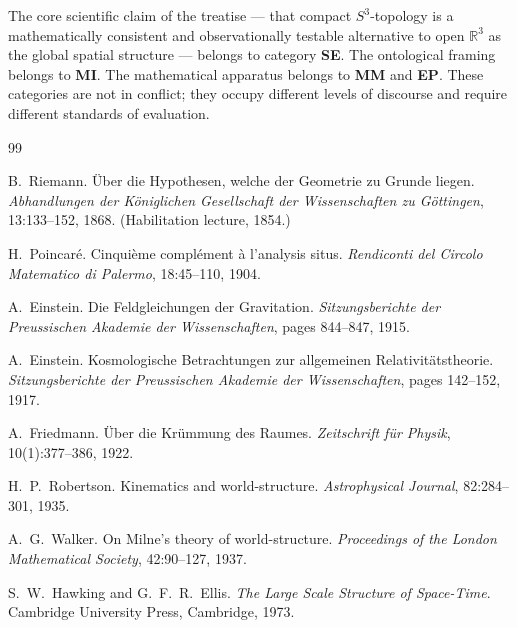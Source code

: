 \documentclass[12pt,a4paper]{article}
\theoremstyle{definition}
\begin{document}
\bigskip
The core scientific claim of the treatise — that compact $S^3$-topology is a mathematically consistent and observationally testable alternative to open $\mathbb{R}^3$ as the global spatial structure — belongs to category \colorbox{clSpec}{\textbf{SE}}.
The ontological framing belongs to \colorbox{clMeta}{\textbf{MI}}.
The mathematical apparatus belongs to \colorbox{clModel}{\textbf{MM}} and \colorbox{clEstab}{\textbf{EP}}.
These categories are not in conflict; they occupy different levels of discourse and require different standards of evaluation.

\clearpage
\begin{thebibliography}{99}

B.~Riemann.
\newblock \"{U}ber die Hypothesen, welche der Geometrie zu Grunde liegen.
\newblock \emph{Abhandlungen der K\"{o}niglichen Gesellschaft der Wissenschaften zu G\"{o}ttingen}, 13:133--152, 1868.
\newblock (Habilitation lecture, 1854.)

H.~Poincar\'{e}.
\newblock Cinqui\`{e}me compl\'{e}ment \`{a} l'analysis situs.
\newblock \emph{Rendiconti del Circolo Matematico di Palermo}, 18:45--110, 1904.

A.~Einstein.
\newblock Die Feldgleichungen der Gravitation.
\newblock \emph{Sitzungsberichte der Preussischen Akademie der Wissenschaften}, pages 844--847, 1915.

A.~Einstein.
\newblock Kosmologische Betrachtungen zur allgemeinen Relativit\"{a}tstheorie.
\newblock \emph{Sitzungsberichte der Preussischen Akademie der Wissenschaften}, pages 142--152, 1917.

A.~Friedmann.
\newblock \"{U}ber die Kr\"{u}mmung des Raumes.
\newblock \emph{Zeitschrift f\"{u}r Physik}, 10(1):377--386, 1922.

H.~P.~Robertson.
\newblock Kinematics and world-structure.
\newblock \emph{Astrophysical Journal}, 82:284--301, 1935.

A.~G.~Walker.
\newblock On Milne's theory of world-structure.
\newblock \emph{Proceedings of the London Mathematical Society}, 42:90--127, 1937.

S.~W.~Hawking and G.~F.~R.~Ellis.
\newblock \emph{The Large Scale Structure of Space-Time}.
\newblock Cambridge University Press, Cambridge, 1973.


\end{thebibliography}
\end{document}
